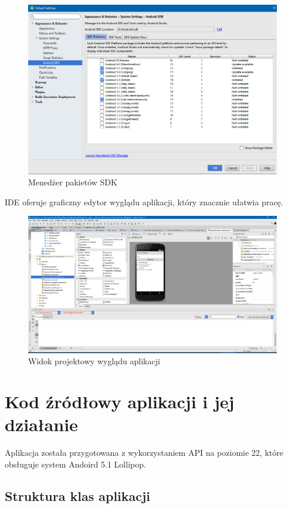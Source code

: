 \begin{figure}[H]
	\centering
	\includegraphics[width=1\linewidth]{sdkmenager}
	\caption{Menedżer pakietów SDK}
	\label{fig:sdkmenager}
\end{figure}
IDE oferuje graficzny edytor wyglądu aplikacji, który znacznie ułatwia pracę.
\begin{figure}[H]
	\centering
	\includegraphics[width=1\linewidth]{widokprojektowy}
	\caption{Widok projektowy wyglądu aplikacji}
	\label{fig:widokprojektowy}
\end{figure}
\section{Kod źródłowy aplikacji i jej działanie}

Aplikacja została przygotowana z wykorzystaniem API na poziomie 22, które obsługuje system Andoird 5.1 Lollipop.

\subsection{Struktura klas aplikacji}


